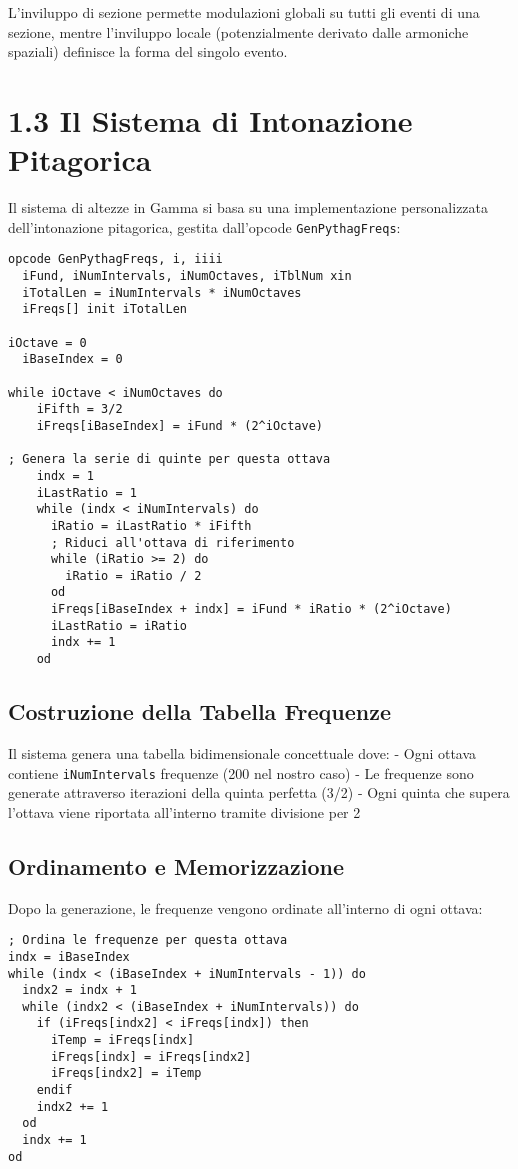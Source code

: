 L'inviluppo di sezione permette modulazioni globali su tutti gli eventi di una sezione, mentre l'inviluppo locale (potenzialmente derivato dalle armoniche spaziali) definisce la forma del singolo evento.
\section{1.3 Il Sistema di Intonazione Pitagorica}
Il sistema di altezze in Gamma si basa su una implementazione personalizzata dell'intonazione pitagorica, gestita dall'opcode \texttt{GenPythagFreqs}:

\begin{lstlisting}[language=Csound]
opcode GenPythagFreqs, i, iiii
  iFund, iNumIntervals, iNumOctaves, iTblNum xin
  iTotalLen = iNumIntervals * iNumOctaves
  iFreqs[] init iTotalLen

iOctave = 0
  iBaseIndex = 0

while iOctave < iNumOctaves do
    iFifth = 3/2
    iFreqs[iBaseIndex] = iFund * (2^iOctave)

; Genera la serie di quinte per questa ottava
    indx = 1
    iLastRatio = 1
    while (indx < iNumIntervals) do
      iRatio = iLastRatio * iFifth
      ; Riduci all'ottava di riferimento
      while (iRatio >= 2) do
        iRatio = iRatio / 2
      od
      iFreqs[iBaseIndex + indx] = iFund * iRatio * (2^iOctave)
      iLastRatio = iRatio
      indx += 1
    od
\end{lstlisting}
\subsection{Costruzione della Tabella Frequenze}
Il sistema genera una tabella bidimensionale concettuale dove:
- Ogni ottava contiene \texttt{iNumIntervals} frequenze (200 nel nostro caso)
- Le frequenze sono generate attraverso iterazioni della quinta perfetta (3/2)
- Ogni quinta che supera l'ottava viene riportata all'interno tramite divisione per 2
\subsection{Ordinamento e Memorizzazione}
Dopo la generazione, le frequenze vengono ordinate all'interno di ogni ottava:

\begin{lstlisting}[language=Csound]
; Ordina le frequenze per questa ottava
indx = iBaseIndex
while (indx < (iBaseIndex + iNumIntervals - 1)) do
  indx2 = indx + 1
  while (indx2 < (iBaseIndex + iNumIntervals)) do
    if (iFreqs[indx2] < iFreqs[indx]) then
      iTemp = iFreqs[indx]
      iFreqs[indx] = iFreqs[indx2]
      iFreqs[indx2] = iTemp
    endif
    indx2 += 1
  od
  indx += 1
od
\end{lstlisting}

